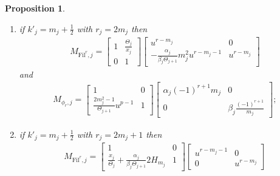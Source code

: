 \documentclass[11pt]{amsart}
\theoremstyle{definition}
\numberwithin{equation}{subsection}
\theoremstyle{plain}
\theoremstyle{plain}
\theoremstyle{plain}
\theoremstyle{plain}
\theoremstyle{plain}
\theoremstyle{plain}
\theoremstyle{plain}
\theoremstyle{plain}
\newtheorem{prop}[equation]{Proposition}
\theoremstyle{plain}
\theoremstyle{plain}
\theoremstyle{plain}
\theoremstyle{plain}
\theoremstyle{definition}
\theoremstyle{definition}
\theoremstyle{definition}
\theoremstyle{remark}
\renewcommand{\(}{\textup{(}}
\renewcommand{\)}{\textup{)}}
\newcommand{\Fil}{\mathrm{Fil}}
\begin{document}
\begin{prop}
\begin{enumerate}[leftmargin=*]
\begin{align*}
\begin{bmatrix}
            1 & p\Theta_{j+1}\frac{k_j(r_j-k_j)}{r_j-2k_j} \\
            \frac{2(r_j-k_j-1)k_j+r_j-1}{\Theta_{j+1}}u^{p-1} & 1
        \end{bmatrix}
        \begin{bmatrix}
            \alpha_j \frac{(-1)^{r-r_j}}{\binom{r_j-k_j-1}{k_j}} & 0 \\
            0 & \beta_j (-1)^r\binom{r_j-k_j-1}{k_j}
        \end{bmatrix};
    \end{align*}
\item if $k'_j=m_j+\frac{1}{2}$ with $r_j=2m_j$ then
    \begin{align*}
    M_{\Fil^r,j}
        =
        \begin{bmatrix}
            1 & \frac{\Theta_j}{x_j} \\
            0 & 1
        \end{bmatrix}
        \begin{bmatrix}
            u^{r-m_j} & 0 \\
            -\frac{\alpha_j}{\beta_j\Theta_{j+1}} m_j^2 u^{r-m_j-1}
             & u^{r-m_j}
        \end{bmatrix}
    \end{align*}
    and
    \begin{align*}
    M_{\phi_r,j}
        =
        \begin{bmatrix}
            1 & 0 \\
            \frac{2m_j^2-1}{\Theta_{j+1}}u^{p-1} & 1
        \end{bmatrix}
        \begin{bmatrix}
            \alpha_j (-1)^{r+1}m_j & 0 \\
            0 & \beta_j \frac{(-1)^{r+1}}{m_j}
        \end{bmatrix};
    \end{align*}
\item if $k'_j=m_j+\frac{1}{2}$ with $r_j=2m_j+1$ then
    \begin{align*}
    M_{\Fil^r,j}
        =
        \begin{bmatrix}
            1 & 0 \\
            \frac{x_j}{\Theta_j}+\frac{\alpha_j}{\beta_j\Theta_{j+1}}2H_{m_j} & 1
        \end{bmatrix}
        \begin{bmatrix}
            u^{r-m_j-1} & 0 \\
            0 & u^{r-m_j}
        \end{bmatrix}

\end{align*}
\end{enumerate}
\end{prop}
\end{document}
